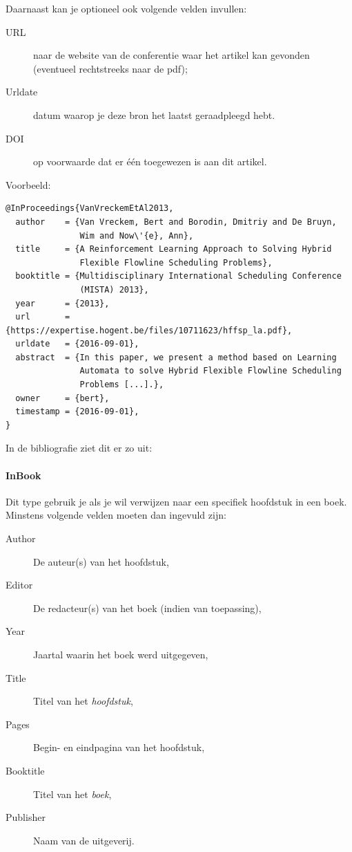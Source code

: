 Daarnaast kan je optioneel ook volgende velden invullen:

\begin{description}
  \item[URL] naar de website van de conferentie waar het artikel kan gevonden (eventueel rechtstreeks naar de pdf);
  \item[Urldate] datum waarop je deze bron het laatst geraadpleegd hebt.
  \item[DOI] op voorwaarde dat er één toegewezen is aan dit artikel.
\end{description}

Voorbeeld:
\begin{verbatim}
@InProceedings{VanVreckemEtAl2013,
  author    = {Van Vreckem, Bert and Borodin, Dmitriy and De Bruyn,
               Wim and Now\'{e}, Ann},
  title     = {A Reinforcement Learning Approach to Solving Hybrid
               Flexible Flowline Scheduling Problems},
  booktitle = {Multidisciplinary International Scheduling Conference
               (MISTA) 2013},
  year      = {2013},
  url       = {https://expertise.hogent.be/files/10711623/hffsp_la.pdf},
  urldate   = {2016-09-01},
  abstract  = {In this paper, we present a method based on Learning
               Automata to solve Hybrid Flexible Flowline Scheduling 
               Problems [...].},
  owner     = {bert},
  timestamp = {2016-09-01},
}
\end{verbatim}

In de bibliografie ziet dit er zo uit: 

\paragraph{InBook}

Dit type gebruik je als je wil verwijzen naar een specifiek hoofdstuk in een boek. Minstens volgende velden moeten dan ingevuld zijn:

\begin{description}
  \item[Author] De auteur(s) van het hoofdstuk,
  \item[Editor] De redacteur(s) van het boek (indien van toepassing),
  \item[Year] Jaartal waarin het boek werd uitgegeven,
  \item[Title] Titel van het \emph{hoofdstuk},
  \item[Pages] Begin- en eindpagina van het hoofdstuk,
  \item[Booktitle] Titel van het \emph{boek},
  \item[Publisher] Naam van de uitgeverij.
\end{description}


